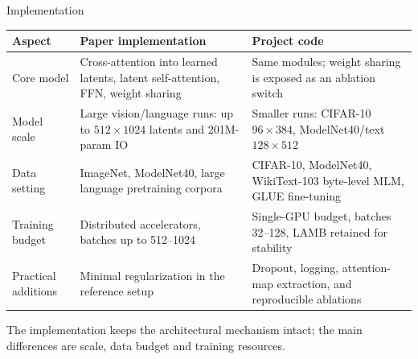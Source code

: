 \documentclass[aspectratio=169,11pt]{beamer}
\begin{document}
\begin{frame}[shrink=5]{Implementation}
  \vspace{0.15em}
  \begin{table}
    \centering\scriptsize
    \begin{tabular}{>{\raggedright\arraybackslash}p{}>{\raggedright\arraybackslash}p{}>{\raggedright\arraybackslash}p{}}
      \toprule
      \textbf{Aspect} & \textbf{Paper implementation} & \textbf{Project code} \\
      \midrule
      Core model &
      Cross-attention into learned latents, latent self-attention, FFN, weight sharing &
      Same modules; weight sharing is exposed as an ablation switch \\
      \midrule
      Model scale &
      Large vision/language runs: up to $512{\times}1024$ latents and 201M-param IO &
      Smaller runs: CIFAR-10 $96{\times}384$, ModelNet40/text $128{\times}512$ \\
      \midrule
      Data setting &
      ImageNet, ModelNet40, large language pretraining corpora &
      CIFAR-10, ModelNet40, WikiText-103 byte-level MLM, GLUE fine-tuning \\
      \midrule
      Training budget &
      Distributed accelerators, batches up to 512--1024 &
      Single-GPU budget, batches 32--128, LAMB retained for stability \\
      \midrule
      Practical additions &
      Minimal regularization in the reference setup &
      Dropout, logging, attention-map extraction, and reproducible ablations \\
      \bottomrule
    \end{tabular}
  \end{table}

  \vspace{0.25em}
  {\small The implementation keeps the architectural mechanism intact; the main differences are scale, data budget and training resources.}
\end{frame}
\end{document}
